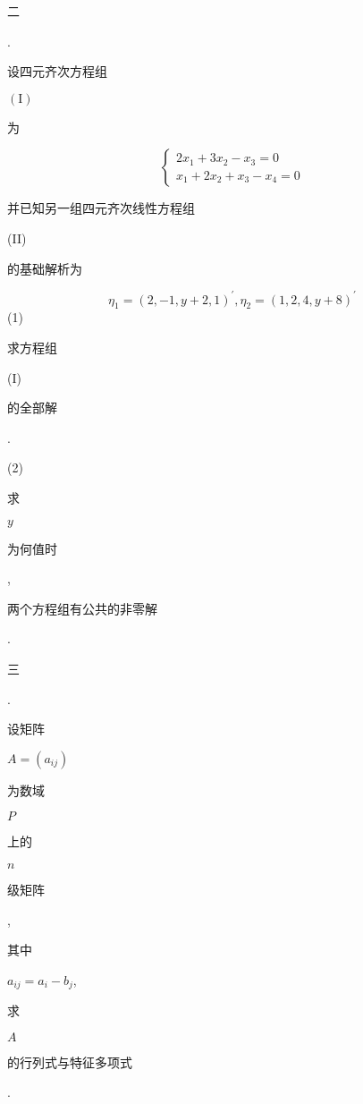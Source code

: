 \documentclass[10pt]{article}
\begin{document}
\begin{CJK}{UTF8}{mj}二\end{CJK}. \begin{CJK}{UTF8}{mj}设四元齐次方程组\end{CJK} $(\mathrm{I})$ \begin{CJK}{UTF8}{mj}为\end{CJK}
$$
\left\{\begin{array}{l}
2 x_{1}+3 x_{2}-x_{3}=0 \\
x_{1}+2 x_{2}+x_{3}-x_{4}=0
\end{array}\right.
$$
\begin{CJK}{UTF8}{mj}并已知另一组四元齐次线性方程组\end{CJK} (II) \begin{CJK}{UTF8}{mj}的基础解析为\end{CJK}
$$
\eta_{1}=(2,-1, y+2,1)^{\prime}, \eta_{2}=(1,2,4, y+8)^{\prime}
$$
(1) \begin{CJK}{UTF8}{mj}求方程组\end{CJK} (I) \begin{CJK}{UTF8}{mj}的全部解\end{CJK}.

(2) \begin{CJK}{UTF8}{mj}求\end{CJK} $y$ \begin{CJK}{UTF8}{mj}为何值时\end{CJK}, \begin{CJK}{UTF8}{mj}两个方程组有公共的非零解\end{CJK}.

\begin{CJK}{UTF8}{mj}三\end{CJK}. \begin{CJK}{UTF8}{mj}设矩阵\end{CJK} $A=\left(a_{i j}\right)$ \begin{CJK}{UTF8}{mj}为数域\end{CJK} $P$ \begin{CJK}{UTF8}{mj}上的\end{CJK} $n$ \begin{CJK}{UTF8}{mj}级矩阵\end{CJK}, \begin{CJK}{UTF8}{mj}其中\end{CJK} $a_{i j}=a_{i}-b_{j}$, \begin{CJK}{UTF8}{mj}求\end{CJK} $A$ \begin{CJK}{UTF8}{mj}的行列式与特征多项式\end{CJK}.
\end{document}
